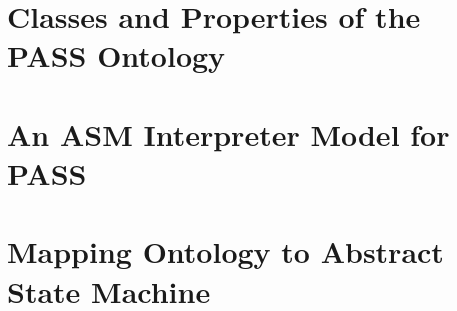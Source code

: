\appendix

\chapter[Classes and Properties of the PASS Ontology]{Classes and Properties of the\\PASS Ontology}



\chapter{An ASM Interpreter Model for PASS}
\label{ASM-Interpreter}



\chapter{Mapping Ontology to Abstract State Machine}



